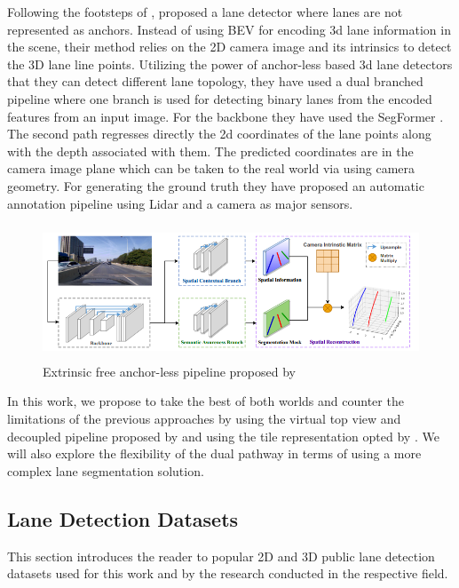 Following the footsteps of \cite{DBLP:journals/corr/abs-2011-01535}, \cite{yan2022once} proposed a lane detector where lanes are not represented as anchors. Instead of using BEV for encoding 3d lane information in the scene, their method relies on the 2D camera image and its intrinsics to detect the 3D lane line points. Utilizing the power of anchor-less based 3d lane detectors that they can detect different lane topology, they have used a dual branched pipeline where one branch is used for detecting binary lanes from the encoded features from an input image. For the backbone they have used the SegFormer \cite{DBLP:journals/corr/abs-2105-15203}. The second path regresses directly the 2d coordinates of the lane points along with the depth associated with them. The predicted coordinates are in the camera image plane which can be taken to the real world via using camera geometry. For generating the ground truth they have proposed an automatic annotation pipeline using Lidar and a camera as major sensors.

\begin{figure}[h]
    \centering
\includegraphics[width=12cm, height=4cm]{images/once_pipeline.png}
    \caption{Extrinsic free anchor-less pipeline proposed by \cite{yan2022once}}
    \end{figure}

In this work, we propose to take the best of both worlds and counter the limitations of the previous approaches by using the virtual top view and decoupled pipeline proposed by \cite{guo2020gen} and using the tile representation opted by \cite{DBLP:journals/corr/abs-2011-01535}. We will also explore the flexibility of the dual pathway in terms of using a more complex lane segmentation solution.

\subsection{Lane Detection Datasets}
This section introduces the reader to popular 2D and 3D public lane detection datasets used for this work and by the research conducted in the respective field. 

